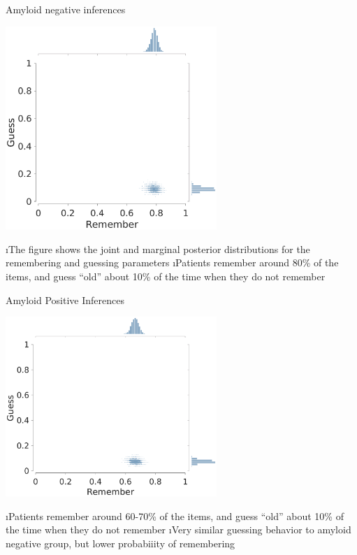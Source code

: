 \documentclass[10pt]{beamer}
\begin{document}
\begin{frame}[fragile]{Amyloid negative inferences}
\begin{center}
{\includegraphics[width = 0.6\textwidth, trim = {0cm 0 0cm 1.75cm}, clip]{oneHighThreshold_1_betaAmyloidNegative.eps}}
\end{center}

\bi
\i The figure shows the joint and marginal posterior distributions for the remembering and guessing parameters
\i Patients remember around 80\% of the items, and guess ``old'' about 10\% of the time when they do not remember
\ei

\end{frame}

\begin{frame}[fragile]{Amyloid Positive Inferences}
\begin{center}
\includegraphics[width = 0.6\textwidth, trim = {0cm 0 0cm 1.5cm}, clip]{oneHighThreshold_1_betaAmyloidPositive.eps}
\end{center}
\bi
\i Patients remember around 60-70\% of the items, and guess ``old'' about 10\% of the time when they do not remember
\i Very similar guessing behavior to amyloid negative group, but lower probabiiity of remembering
\ei
\end{frame}
\end{document}
